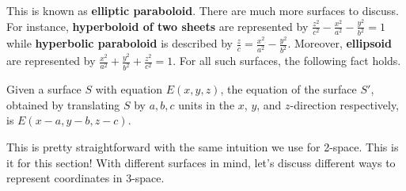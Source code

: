 \documentclass[../../main.tex]{subfiles}
\begin{document}
This is known as \textbf{elliptic paraboloid}. There are much more
surfaces to discuss. For instance, \textbf{hyperboloid of two sheets}
are represented by $\frac{z^2}{c^2} - \frac{x^2}{a^2} -
\frac{y^2}{b^2} = 1$ while \textbf{hyperbolic paraboloid} is described
by $\frac{z}{c} = \frac{x^2}{a^2} - \frac{y^2}{b^2}$. Moreover,
\textbf{ellipsoid} are represented by $\frac{x^2}{a^2} +
\frac{y^2}{b^2} + \frac{z^2}{c^2} = 1$. For all such surfaces,
the following fact holds.

\begin{important}
Given a surface $S$ with equation $E(x, y, z)$, the equation of the
surface $S'$, obtained by translating $S$ by $a, b, c$ units in the
$x$, $y$, and $z$-direction respectively, is $E(x - a, y - b, z - c)$.
\end{important}

This is pretty straightforward with the same intuition we use for
2-space. This is it for this section! With different surfaces in
mind, let's discuss different ways to represent coordinates in
3-space.
\end{document}

